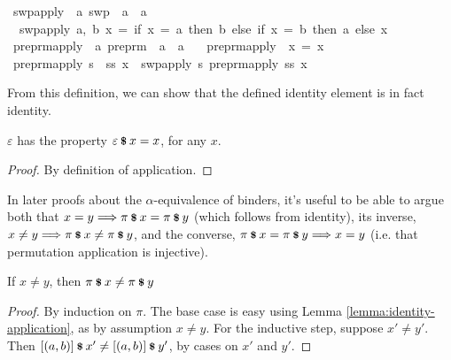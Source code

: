 \begin{implementation}
\isamarkupfalse%
\ swp{\isacharunderscore}apply\ {\isacharcolon}{\isacharcolon}\ {\isachardoublequoteopen}{\isacharprime}a\ swp\ {\isasymRightarrow}\ {\isacharprime}a\ {\isasymRightarrow}\ {\isacharprime}a{\isachardoublequoteclose}\ \isanewline
\ \ {\isachardoublequoteopen}swp{\isacharunderscore}apply\ {\isacharparenleft}a,\ b{\isacharparenright}\ x\ =\ {\isacharparenleft}if\ x\ =\ a\ then\ b\ else\ {\isacharparenleft}if\ x\ =\ b\ then\ a\ else\ x{\isacharparenright}{\isacharparenright}{\isachardoublequoteclose}\isanewline
\isanewline
{}\isamarkupfalse%
\ preprm{\isacharunderscore}apply\ {\isacharcolon}{\isacharcolon}\ {\isachardoublequoteopen}{\isacharprime}a\ preprm\ {\isasymRightarrow}\ {\isacharprime}a\ {\isasymRightarrow}\ {\isacharprime}a{\isachardoublequoteclose}\ \isanewline
\ \ {\isachardoublequoteopen}preprm{\isacharunderscore}apply\ {\isacharbrackleft}{\isacharbrackright}\ x\ =\ x{\isachardoublequoteclose}\isanewline
{\isacharbar}\ {\isachardoublequoteopen}preprm{\isacharunderscore}apply\ {\isacharparenleft}s\ {\isacharhash}\ ss{\isacharparenright}\ x\ {\isacharequal}\ swp{\isacharunderscore}apply\ s\ {\isacharparenleft}preprm{\isacharunderscore}apply\ ss\ x{\isacharparenright}{\isachardoublequoteclose}\isanewline
\end{implementation}

From this definition, we can show that the defined identity element is in fact identity.

\begin{lemma}
\label{lemma:identity-application}
\(\varepsilon\) has the property \(\varepsilon \mathbin{\textrm{\footnotesize{\textbf{\$}}}} x = x\), for any \(x\).
\end{lemma}
\begin{proof}
By definition of application.
\end{proof}

In later proofs about the \(\alpha\)-equivalence of binders, it's useful to be able to argue both that \(x = y \Longrightarrow \pi \mathbin{\textrm{\footnotesize{\textbf{\$}}}} x = \pi \mathbin{\textrm{\footnotesize{\textbf{\$}}}} y\) (which follows from identity), its inverse, \(x \neq y \Longrightarrow \pi \mathbin{\textrm{\footnotesize{\textbf{\$}}}} x \neq \pi \mathbin{\textrm{\footnotesize{\textbf{\$}}}} y\), and the converse, \(\pi \mathbin{\textrm{\footnotesize{\textbf{\$}}}} x = \pi \mathbin{\textrm{\footnotesize{\textbf{\$}}}} y \Longrightarrow x = y\) (i.e. that permutation application is injective).

\begin{lemma}
\label{lemma:apply-unequal}
If \(x \neq y\), then \(\pi \mathbin{\textrm{\footnotesize{\textbf{\$}}}} x \neq \pi \mathbin{\textrm{\footnotesize{\textbf{\$}}}} y\)
\end{lemma}
\begin{proof}
By induction on \(\pi\).
The base case is easy using Lemma \ref{lemma:identity-application}, as by assumption \(x \neq y\).
For the inductive step, suppose \(x' \neq y'\).
Then \([\left(a, b\right)] \mathbin{\textrm{\footnotesize{\textbf{\$}}}} x' \neq [\left(a, b\right)] \mathbin{\textrm{\footnotesize{\textbf{\$}}}} y'\), by cases on \(x'\) and \(y'\).
\end{proof}


